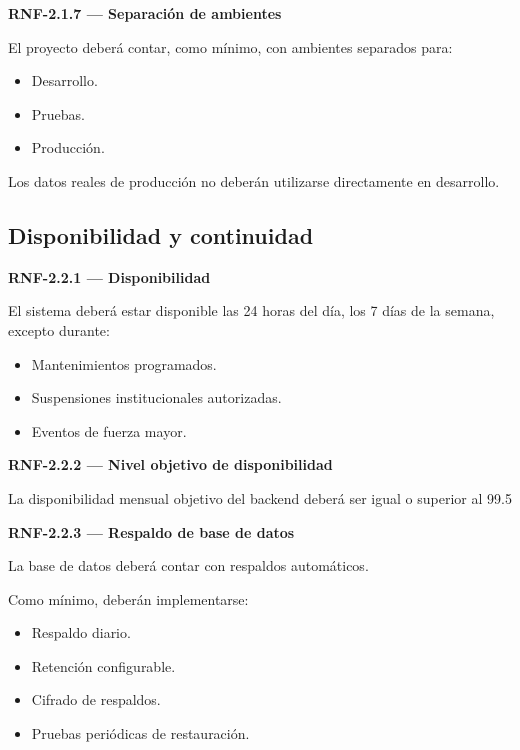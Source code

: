\documentclass[12pt,a4paper]{article}
\newcommand{\RNF}[1]{\textbf{\color{secondary}RNF-#1}}
\newenvironment{requisito}[1]
{
\begin{center}
\begin{minipage}{0.96\textwidth}
\colorbox{requirement}{
\begin{minipage}{0.94\textwidth}
\textbf{#1}
\end{minipage}
}
\vspace{2mm}
}
{
\end{minipage}
\end{center}
}
\begin{document}
\begin{requisito}{\RNF{2.1.7} --- Separación de ambientes}
El proyecto deberá contar, como mínimo, con ambientes separados para:

\begin{itemize}[leftmargin=*]
\item Desarrollo.
\item Pruebas.
\item Producción.
\end{itemize}

Los datos reales de producción no deberán utilizarse directamente en desarrollo.
\end{requisito}

\subsection{Disponibilidad y continuidad}

\begin{requisito}{\RNF{2.2.1} --- Disponibilidad}
El sistema deberá estar disponible las 24 horas del día, los 7 días de la semana,
excepto durante:

\begin{itemize}[leftmargin=*]
\item Mantenimientos programados.
\item Suspensiones institucionales autorizadas.
\item Eventos de fuerza mayor.
\end{itemize}
\end{requisito}

\begin{requisito}{\RNF{2.2.2} --- Nivel objetivo de disponibilidad}
La disponibilidad mensual objetivo del backend deberá ser igual o superior al
99.5%
\end{requisito}

\begin{requisito}{\RNF{2.2.3} --- Respaldo de base de datos}
La base de datos deberá contar con respaldos automáticos.

Como mínimo, deberán implementarse:

\begin{itemize}[leftmargin=*]
\item Respaldo diario.
\item Retención configurable.
\item Cifrado de respaldos.
\item Pruebas periódicas de restauración.
\end{itemize}
\end{requisito}
\end{document}

